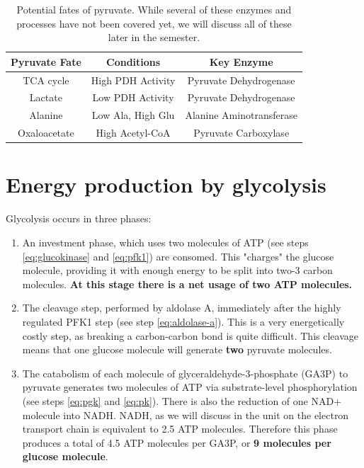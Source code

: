 \documentclass{tufte-handout}
\begin{document}
\begin{table}
\centering
\caption{Potential fates of pyruvate.  While several of these enzymes and processes have not been covered yet, we will discuss all of these later in the semester.}
\label{tab:pyruvate-fates}
\begin{tabular}{ccc}
\hline
\textbf {Pyruvate Fate} & \textbf{Conditions}  & \textbf{Key Enzyme} \\
\hline
TCA cycle & High PDH Activity & Pyruvate Dehydrogenase \\
Lactate & Low PDH Activity & Pyruvate Dehydrogenase \\
Alanine & Low Ala, High Glu & Alanine Aminotransferase\\
Oxaloacetate & High Acetyl-CoA & Pyruvate Carboxylase \\
\hline
\end{tabular}
\end{table}

\section{Energy production by glycolysis}

Glycolysis occurs in three phases:

\begin{enumerate}
\item An investment phase, which uses two molecules of ATP (see steps \ref{eq:glucokinase} and \ref{eq:pfk1}) are consomed.  This "charges" the glucose molecule, providing it with enough energy to be split into two-3 carbon molecules.  \textbf{At this stage there is a net usage of two ATP molecules.}
\item The cleavage step, performed by aldolase A, immediately after the highly regulated PFK1 step (see step \ref{eq:aldolase-a}).  This is a very energetically costly step, as breaking a carbon-carbon bond is quite difficult.  This cleavage means that one glucose molecule will generate \textbf{two} pyruvate molecules.
\item The catabolism of each molecule of glyceraldehyde-3-phosphate (GA3P) to pyruvate generates two molecules of ATP via substrate-level phosphorylation (see steps \ref{eq:pgk} and \ref{eq:pk}).  There is also the reduction of one NAD+ molecule into NADH.  NADH, as we will discuss in the unit on the electron transport chain is equivalent to 2.5 ATP molecules.  Therefore this phase produces a total of 4.5 ATP molecules per GA3P, or \textbf{9 molecules per glucose molecule}.
\end{enumerate}
\end{document}
